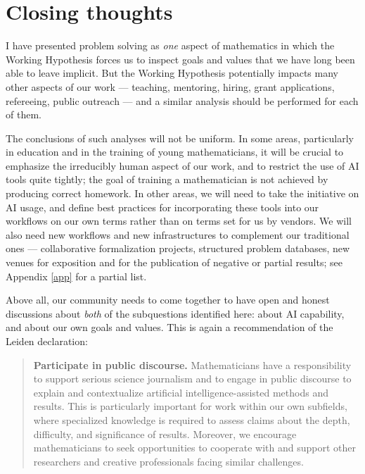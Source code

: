 \documentclass[12pt]{amsart}
\theoremstyle{definition}
\begin{document}
\section{Closing thoughts}

I have presented problem solving as \emph{one} aspect of mathematics in which the Working Hypothesis forces us to inspect goals and values that we have long been able to leave implicit.  But the Working Hypothesis potentially impacts many other aspects of our work --- teaching, mentoring, hiring, grant applications, refereeing, public outreach --- and a similar analysis should be performed for each of them.  

The conclusions of such analyses will not be uniform.  In some areas, particularly in education and in the training of young mathematicians, it will be crucial to emphasize the irreducibly human aspect of our work, and to restrict the use of AI tools quite tightly; the goal of training a mathematician is not achieved by producing correct homework.  In other areas, we will need to take the initiative on AI usage, and define best practices for incorporating these tools into our workflows on our own terms rather than on terms set for us by vendors.  We will also need new workflows and new infrastructures to complement our traditional ones --- collaborative formalization projects, structured problem databases, new venues for exposition and for the publication of negative or partial results; see Appendix \ref{app} for a partial list.

Above all, our community needs to come together to have open and honest discussions about \emph{both} of the subquestions identified here: about AI capability, and about our own goals and values.  This is again a recommendation of the Leiden declaration:

\medskip

\begin{quote}
\textbf{Participate in public discourse.} Mathematicians have a responsibility to support serious science journalism and to engage in public discourse to explain and contextualize artificial intelligence-assisted methods and results. This is particularly important for work within our own subfields, where specialized knowledge is required to assess claims about the depth, difficulty, and significance of results. Moreover, we encourage mathematicians to seek opportunities to cooperate with and support other researchers and creative professionals facing similar challenges.
\end{quote}
\end{document}
